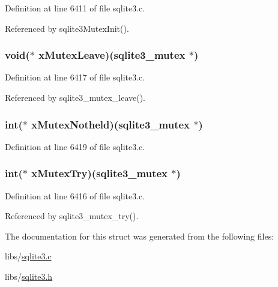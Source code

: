 Definition at line 6411 of file sqlite3.\+c.



Referenced by sqlite3\+Mutex\+Init().

\hypertarget{structsqlite3__mutex__methods_a8f5dbd79462481b7b67b619528812561}{}
\subsubsection[{x\+Mutex\+Leave}]{\setlength{\rightskip}{0pt plus 5cm}void($\ast$ x\+Mutex\+Leave)({\bf sqlite3\+\_\+mutex} $\ast$)}\label{structsqlite3__mutex__methods_a8f5dbd79462481b7b67b619528812561}


Definition at line 6417 of file sqlite3.\+c.



Referenced by sqlite3\+\_\+mutex\+\_\+leave().

\hypertarget{structsqlite3__mutex__methods_a37187ad856ffb0ddb9c8d8d63b681025}{}
\subsubsection[{x\+Mutex\+Notheld}]{\setlength{\rightskip}{0pt plus 5cm}int($\ast$ x\+Mutex\+Notheld)({\bf sqlite3\+\_\+mutex} $\ast$)}\label{structsqlite3__mutex__methods_a37187ad856ffb0ddb9c8d8d63b681025}


Definition at line 6419 of file sqlite3.\+c.

\hypertarget{structsqlite3__mutex__methods_af739cd32a41c65eb92aa0dbcf22cdfc7}{}
\subsubsection[{x\+Mutex\+Try}]{\setlength{\rightskip}{0pt plus 5cm}int($\ast$ x\+Mutex\+Try)({\bf sqlite3\+\_\+mutex} $\ast$)}\label{structsqlite3__mutex__methods_af739cd32a41c65eb92aa0dbcf22cdfc7}


Definition at line 6416 of file sqlite3.\+c.



Referenced by sqlite3\+\_\+mutex\+\_\+try().



The documentation for this struct was generated from the following files\+:\begin{DoxyCompactItemize}
\item 
libs/\hyperlink{sqlite3_8c}{sqlite3.\+c}\item 
libs/\hyperlink{sqlite3_8h}{sqlite3.\+h}\end{DoxyCompactItemize}
